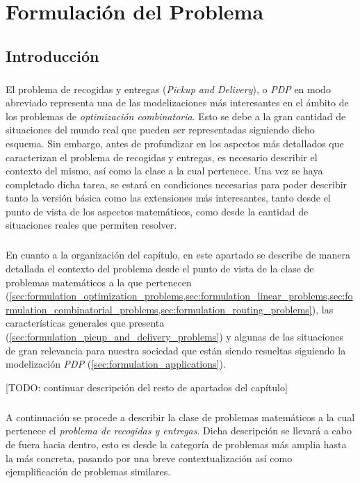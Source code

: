 \documentclass{subfiles}
\begin{document}
  \chapter{Formulación del Problema}
  \label{chap:formulation}

    \section{Introducción}
    \label{sec:formulation_introduction}

      \paragraph{}
      El problema de recogidas y entregas (\emph{Pickup and Delivery}), o \emph{PDP} en modo abreviado representa una de las modelizaciones más interesantes en el ámbito de los problemas de \emph{optimización combinatoria}. Esto se debe a la gran cantidad de situaciones del mundo real que pueden ser representadas siguiendo dicho esquema. Sin embargo, antes de profundizar en los aspectos más detallados que caracterizan el problema de recogidas y entregas, es necesario describir el contexto del mismo, así como la clase a la cual pertenece. Una vez se haya completado dicha tarea, se estará en condiciones necesarias para poder describir tanto la versión básica como las extensiones más interesantes, tanto desde el punto de vista de los aspectos matemáticos, como desde la cantidad de situaciones reales que permiten resolver.

      \paragraph{}
      En cuanto a la organización del capítulo, en este apartado se describe de manera detallada el contexto del problema desde el punto de vista de la clase de problemas matemáticos a la que pertenecen (\cref{sec:formulation_optimization_problems,sec:formulation_linear_problems,sec:formulation_combinatorial_problems,sec:formulation_routing_problems}), las características generales que presenta (\cref{sec:formulation_picup_and_delivery_problems}) y algunas de las situaciones de gran relevancia para nuestra sociedad que están siendo resueltas siguiendo la modelización \emph{PDP} (\cref{sec:formulation_applications}).

      [TODO: continuar descripción del resto de apartados del capítulo]

      \paragraph{}
      A continuación se procede a describir la clase de problemas matemáticos a la cual pertenece el \emph{problema de recogidas y entregas}. Dicha descripción se llevará a cabo de fuera hacia dentro, esto es desde la categoría de problemas más amplia hasta la más concreta, pasando por una breve contextualización así como ejemplificación de problemas similares.
\end{document}
